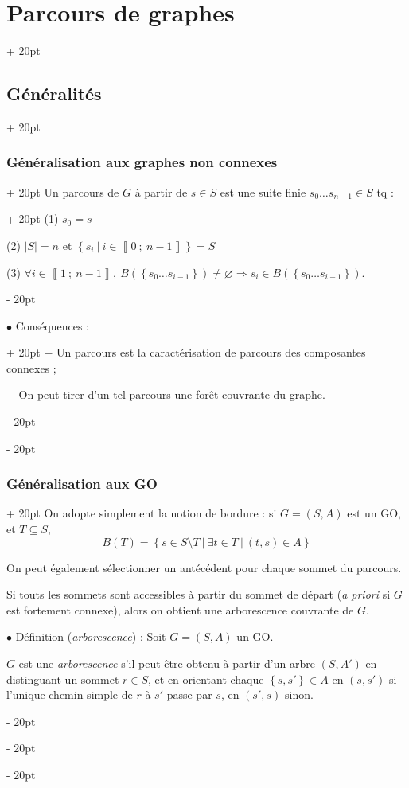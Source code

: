 \documentclass[a4paper, 12pt, twoside]{article}
\newcommand{\nset}[2]{\left\llbracket #1\ ;\ #2 \right\rrbracket}
\newcommand{\set}[1]{\left\{ #1 \right\}}
\newcommand{\abs}[1]{\left\lvert #1 \right\rvert}
\newcommand{\ind}[1][20pt]{\advance\leftskip + #1}
\newcommand{\deind}[1][20pt]{\advance\leftskip - #1}
\newenvironment{indt}[2][20pt]{#2 \par \ind[#1]}{\par \deind} %
\begin{document}
\begin{indt}{\section{Parcours de graphes}}
\begin{indt}{\subsection{Généralités}}
\begin{indt}{\subsubsection{Généralisation aux graphes non connexes}}
                \begin{indt}{Un parcours de $G$ à partir de $s \in S$ est une suite finie $s_0 \ldots s_{n - 1} \in S$ tq :}
                    (1) $s_0 = s$

                    (2) $\abs S = n$ et $\set{s_i\ |\ i \in \nset 0 {n - 1}} = S$

                    (3) $\forall i \in \nset 1 {n - 1},\ B(\set{s_0 \ldots s_{i - 1}}) \neq \varnothing \Rightarrow s_i \in B(\set{s_0 \ldots s_{i - 1}})$.
                \end{indt}

                \vspace{6pt}
                
                \begin{indt}{$\bullet$ Conséquences :}
                    $-$ Un parcours est la caractérisation de parcours des composantes connexes ;

                    $-$ On peut tirer d'un tel parcours une forêt couvrante du graphe.
                \end{indt}
            \end{indt}

            \vspace{12pt}
            
            \begin{indt}{\subsubsection{Généralisation aux GO}}
                On adopte simplement la notion de bordure : si $G = (S, A)$ est un GO, et $T \subseteq S$,
                \[
                    B(T) = \set{s \in S \setminus T\ |\ \exists t \in T\ |\ (t, s) \in A}
                \]

                On peut également sélectionner un antécédent pour chaque sommet du parcours.

                Si touts les sommets sont accessibles à partir du sommet de départ (\textit{a priori} si $G$ est fortement connexe), alors on obtient une arborescence couvrante de $G$.

                \vspace{12pt}
                
                $\bullet$ Définition (\textit{arborescence}) : Soit $G = (S, A)$ un GO.

                $G$ est une \textit{arborescence} s'il peut être obtenu à partir d'un arbre $(S, A')$ en distinguant un sommet $r \in S$, et en orientant chaque $\set{s, s'} \in A$ en $(s, s')$ si l'unique chemin simple de $r$ à $s'$ passe par $s$, en $(s', s)$ sinon.


\end{indt}
\end{indt}
\end{indt}
\end{document}
